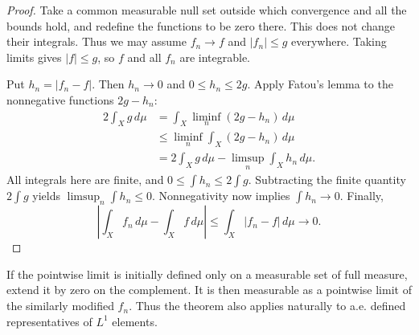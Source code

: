 \begin{proof}
  Take a common measurable null set outside which convergence and
  all the bounds hold, and redefine the functions to be zero there.
  This does not change their integrals. Thus we may assume
  $f_n\to f$ and $|f_n|\leq g$ everywhere. Taking limits gives
  $|f|\leq g$, so $f$ and all $f_n$ are integrable.

  Put $h_n=|f_n-f|$. Then $h_n\to0$ and $0\leq h_n\leq2g$.
  Apply Fatou's lemma to the nonnegative functions $2g-h_n$:
  \begin{align*}
    2\int_X g\,d\mu
      &=\int_X\liminf_n(2g-h_n)\,d\mu\\
      &\leq\liminf_n\int_X(2g-h_n)\,d\mu\\
      &=2\int_X g\,d\mu-\limsup_n\int_X h_n\,d\mu.
  \end{align*}
  All integrals here are finite, and
  $0\leq\int h_n\leq2\int g$. Subtracting the finite quantity
  $2\int g$ yields $\limsup_n\int h_n\leq0$. Nonnegativity now
  implies $\int h_n\to0$. Finally,
  \[
    \left|\int_X f_n\,d\mu-\int_X f\,d\mu\right|
      \leq\int_X|f_n-f|\,d\mu\longrightarrow0.
  \]
\end{proof}

\begin{remark}
  If the pointwise limit is initially defined only on a measurable
  set of full measure, extend it by zero on the complement. It is
  then measurable as a pointwise limit of the similarly modified
  $f_n$. Thus the theorem also applies naturally to a.e. defined
  representatives of $L^1$ elements.
\end{remark}

